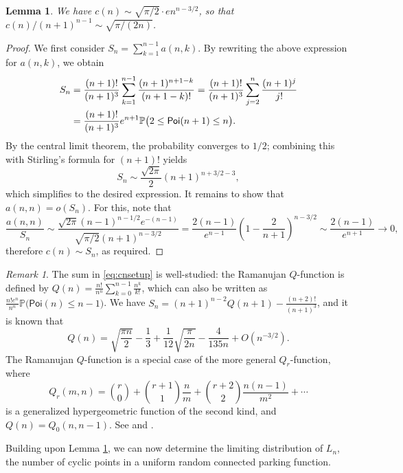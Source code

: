 \documentclass[letterpaper]{amsart}
\theoremstyle{plain}
\newtheorem{lemma}[theorem]{Lemma}
\theoremstyle{definition}
\theoremstyle{remark}
\newtheorem*{remark}{Remark}
\newcommand{\IP}{\mathbb{P}}
\newcommand{\Poi}{\mathsf{Poi}}
\begin{document}
\begin{lemma}\label{lm:parking}
 We have $c(n) \sim \sqrt{\pi/2} \cdot e n^{n-3/2}$, so that $c(n)/(n+1)^{n-1} \sim \sqrt{\pi/(2n)}$. 
\end{lemma}

\begin{proof}
 We first consider $S_n=\sum_{k=1}^{n-1} a(n,k)$. By rewriting the above expression for $a(n,k)$, we obtain
 \begin{align}\label{eq:cnsetup}
  S_n 
  &= \frac{(n+1)!}{(n+1)^3} \sum_{k=1}^{n-1} \frac{(n+1)^{n+1-k}}{(n+1-k)!}
   = \frac{(n+1)!}{(n+1)^3} \sum_{j=2}^n \frac{(n+1)^j}{j!}\notag\\
  &= \frac{(n+1)!}{(n+1)^3} e^{n+1} \IP\big(2\leq \Poi(n+1)\leq n\big).
 \end{align}
 By the central limit theorem, the probability converges to $1/2$; combining this with Stirling's formula for $(n+1)!$ yields 
 \[
  S_n
  \sim \frac{\sqrt{2\pi}}{2} (n+1)^{n+3/2-3}, 
 \]
 which simplifies to the desired expression. It remains to show that $a(n,n)=o(S_n)$. For this, note that
 \[
  \frac{a(n,n)}{S_n}
  \sim \frac{\sqrt{2\pi}(n-1)^{n-1/2} e^{-(n-1)}}{\sqrt{\pi/2}(n+1)^{n-3/2}} 
  = \frac{2(n-1)}{e^{n-1}} \left(1-\frac{2}{n+1}\right)^{n-3/2}
  \sim \frac{2(n-1)}{e^{n+1}} \to 0,
 \]
 therefore $c(n)\sim S_n$, as required. 
\end{proof}

\begin{remark}
 The sum in \eqref{eq:cnsetup} is well-studied: the Ramanujan $Q$-function is defined by
 $Q(n) = \frac{n!}{n^n} \sum_{k=0}^{n-1} \frac{n^k}{k!}$, which can also be written as $\frac{n! e^n}{n^n} \IP\big( \Poi(n)\leq n-1\big)$. We have $S_n = (n+1)^{n-2}Q(n+1)
 - \frac{(n+2)!}{(n+1)^3}$, and it is known that
   \[Q(n) = \sqrt{\frac{\pi n}{2}} - \frac13 + \frac1{12} \sqrt{\frac{\pi}{2n}} - \frac{4}{135n} + O(n^{-3/2}).\]
The Ramanujan $Q$-function is a special case of the more general $Q_r$-function, where
\[Q_r(m, n)=\binom{r}{0}+\binom{r+1}{1} \frac{n}{m}+\binom{r+2}{2} \frac{n(n-1)}{m^2}+\cdots\]
is a generalized hypergeometric function of the second kind, and $Q(n)=Q_0(n, n-1)$. See \cite{Flajolet1995} and \cite{Flajolet1998}.
\end{remark}

Building upon Lemma \ref{lm:parking}, we can now determine the limiting distribution of $L_n$, the number of cyclic points in a uniform random connected parking function.
\end{document}
